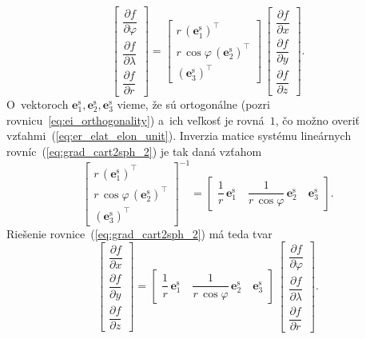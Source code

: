 \documentclass[a4paper, 12pt]{book}
\let\vec\mathbf
\begin{document}
\begin{equation}
\label{eq:grad_cart2sph_2}
\begin{bmatrix}
\dfrac{\partial f}{\partial \varphi}\\[2ex]
\dfrac{\partial f}{\partial \lambda}\\[2ex]
\dfrac{\partial f}{\partial r}
\end{bmatrix}
%
=
%
\begin{bmatrix}
r \, \left( \vec e^\mathrm{s}_1\right)^\top\\
r \, \cos\varphi \, \left(\vec e^\mathrm{s}_2\right)^\top\\
\left(\vec e^\mathrm{s}_3\right)^\top
\end{bmatrix}
%
\,
%
\begin{bmatrix}
\dfrac{\partial f}{\partial x}\\[2ex]
\dfrac{\partial f}{\partial y}\\[2ex]
\dfrac{\partial f}{\partial z}
\end{bmatrix}
%
{.}
\end{equation}
%
O~vektoroch $\vec e^\mathrm{s}_1, \vec e^\mathrm{s}_2, \vec e^\mathrm{s}_3$ 
vieme, že sú ortogonálne (pozri rovnicu~\ref{eq:ei_orthogonality}) a~ich 
veľkosť je rovná~$1$, čo možno overiť vzťahmi~(\ref{eq:er_elat_elon_unit}).  
Inverzia matice systému lineárnych rovníc~(\ref{eq:grad_cart2sph_2}) je tak 
daná vzťahom \parencite{MichelLectures}
%
\begin{equation}
\begin{bmatrix}
r \, \left( \vec e^\mathrm{s}_1 \right)^\top\\[2ex]
r \, \cos\varphi \, \left( \vec e^\mathrm{s}_2 \right)^\top\\[2ex]
\left( \vec e^\mathrm{s}_3 \right)^\top
\end{bmatrix}^{-1}
%
=
%
\begin{bmatrix}
\dfrac{1}{r} \, \vec e^\mathrm{s}_1 \quad \dfrac{1}{r \, \cos\varphi} \, \vec 
e^\mathrm{s}_2 \quad \vec e^\mathrm{s}_3
\end{bmatrix}
{.}
\end{equation}
%
Riešenie rovnice~(\ref{eq:grad_cart2sph_2}) má teda tvar
%
\begin{equation}
\label{eq:grad_cart2sph_3}
\begin{bmatrix}
\dfrac{\partial f}{\partial x}\\[2ex]
\dfrac{\partial f}{\partial y}\\[2ex]
\dfrac{\partial f}{\partial z}
\end{bmatrix}
%
=
%
\begin{bmatrix}
\dfrac{1}{r} \, \vec e^\mathrm{s}_1 \quad \dfrac{1}{r \, \cos\varphi} \, \vec 
e^\mathrm{s}_2 \quad \vec e^\mathrm{s}_3
\end{bmatrix}
%
\,
%
\begin{bmatrix}
\dfrac{\partial f}{\partial \varphi}\\[2ex]
\dfrac{\partial f}{\partial \lambda}\\[2ex]
\dfrac{\partial f}{\partial r}
\end{bmatrix}
%
{.}
\end{equation}
\end{document}
